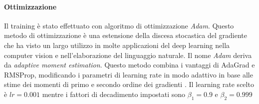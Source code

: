 \paragraph{Ottimizzazione} Il training è stato effettuato con algoritmo di ottimizzazione \textit{Adam}. Questo metodo di ottimizzazione è una estensione della discesa stocastica del gradiente che ha visto un largo utilizzo in molte applicazioni del deep learning nella computer vision e nell'elaborazione del linguaggio naturale. Il nome \textit{Adam} deriva da \textit{adaptive moment estimation}. Questo metodo combina i vantaggi di AdaGrad e RMSProp, modificando i parametri di learning rate in modo adattivo in base alle stime dei momenti di primo e secondo ordine dei gradienti \cite{adam}. Il learning rate scelto è $lr=0.001$ mentre i fattori di decadimento impostati sono $\beta_1=0.9$ e $\beta_2=0.999$

